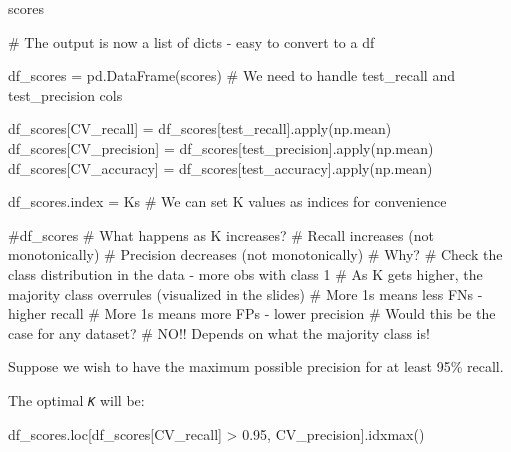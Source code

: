 \documentclass[
  letterpaper,
  DIV=11,
  numbers=noendperiod]{scrreprt}
\newenvironment{Shaded}{\begin{snugshade}}{\end{snugshade}}
\newcommand{\BuiltInTok}[1]{\textcolor[rgb]{0.00,0.23,0.31}{#1}}
\newcommand{\CommentTok}[1]{\textcolor[rgb]{0.37,0.37,0.37}{#1}}
\newcommand{\FloatTok}[1]{\textcolor[rgb]{0.68,0.00,0.00}{#1}}
\newcommand{\NormalTok}[1]{\textcolor[rgb]{0.00,0.23,0.31}{#1}}
\newcommand{\OperatorTok}[1]{\textcolor[rgb]{0.37,0.37,0.37}{#1}}
\newcommand{\StringTok}[1]{\textcolor[rgb]{0.13,0.47,0.30}{#1}}
\begin{document}
\begin{Shaded}
\begin{Highlighting}[]
\NormalTok{scores}

\CommentTok{\# The output is now a list of dicts {-} easy to convert to a df}

\NormalTok{df\_scores }\OperatorTok{=}\NormalTok{ pd.DataFrame(scores) }\CommentTok{\# We need to handle test\_recall and test\_precision cols}

\NormalTok{df\_scores[}\StringTok{\textquotesingle{}CV\_recall\textquotesingle{}}\NormalTok{] }\OperatorTok{=}\NormalTok{ df\_scores[}\StringTok{\textquotesingle{}test\_recall\textquotesingle{}}\NormalTok{].}\BuiltInTok{apply}\NormalTok{(np.mean)}
\NormalTok{df\_scores[}\StringTok{\textquotesingle{}CV\_precision\textquotesingle{}}\NormalTok{] }\OperatorTok{=}\NormalTok{ df\_scores[}\StringTok{\textquotesingle{}test\_precision\textquotesingle{}}\NormalTok{].}\BuiltInTok{apply}\NormalTok{(np.mean)}
\NormalTok{df\_scores[}\StringTok{\textquotesingle{}CV\_accuracy\textquotesingle{}}\NormalTok{] }\OperatorTok{=}\NormalTok{ df\_scores[}\StringTok{\textquotesingle{}test\_accuracy\textquotesingle{}}\NormalTok{].}\BuiltInTok{apply}\NormalTok{(np.mean)}

\NormalTok{df\_scores.index }\OperatorTok{=}\NormalTok{ Ks }\CommentTok{\# We can set K values as indices for convenience}


\CommentTok{\#df\_scores}
\CommentTok{\# What happens as K increases?}
    \CommentTok{\# Recall increases (not monotonically)}
    \CommentTok{\# Precision decreases (not monotonically)}
\CommentTok{\# Why?}
    \CommentTok{\# Check the class distribution in the data {-} more obs with class 1}
    \CommentTok{\# As K gets higher, the majority class overrules (visualized in the slides)}
    \CommentTok{\# More 1s means less FNs {-} higher recall}
    \CommentTok{\# More 1s means more FPs {-} lower precision}
\CommentTok{\# Would this be the case for any dataset?}
    \CommentTok{\# NO!! Depends on what the majority class is!}
\end{Highlighting}
\end{Shaded}

Suppose we wish to have the maximum possible precision for at least 95\%
recall.

The optimal \emph{\texttt{K}} will be:

\begin{Shaded}
\begin{Highlighting}[]
\NormalTok{df\_scores.loc[df\_scores[}\StringTok{\textquotesingle{}CV\_recall\textquotesingle{}}\NormalTok{] }\OperatorTok{\textgreater{}} \FloatTok{0.95}\NormalTok{, }\StringTok{\textquotesingle{}CV\_precision\textquotesingle{}}\NormalTok{].idxmax()}
\end{Highlighting}
\end{Shaded}
\end{document}
